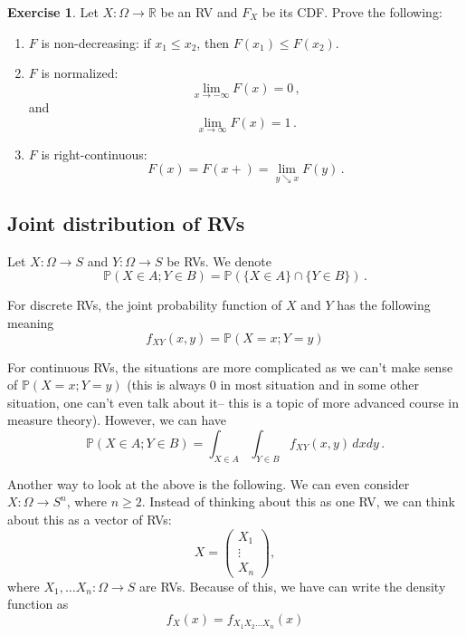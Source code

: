 \documentclass[
  openany]{book}
\theoremstyle{definition}
\theoremstyle{definition}
\theoremstyle{definition}
\newtheorem{exercise}{Exercise}[chapter]
\theoremstyle{definition}
\theoremstyle{remark}
\begin{document}
\begin{exercise}

Let \(X:\Omega \to \mathbb{R}\) be an RV and \(F_X\) be its CDF.
Prove the following:

\begin{enumerate}
\def\labelenumi{\arabic{enumi}.}
\item
  \(F\) is non-decreasing: if \(x_1 \leq x_2\), then \(F(x_1) \leq F(x_2)\).
\item
  \(F\) is normalized:
  \[ \lim_{x\to -\infty} F(x) = 0 \,,\]
  and
  \[ \lim_{x\to \infty} F(x) = 1 \,.\]
\item
  \(F\) is right-continuous:
  \[ F(x) = F(x+) = \lim_{y \searrow x} F(y) \,.\]
\end{enumerate}

\end{exercise}

\hypertarget{joint-distribution-of-rvs}{%
\subsection{Joint distribution of RVs}\label{joint-distribution-of-rvs}}

Let \(X:\Omega \to S\) and \(Y: \Omega \to S\) be RVs.
We denote
\[ \mathbb{P}(X \in A; Y \in B) = \mathbb{P}(\{X\in A\} \cap \{Y \in B \}) \,. \]

For discrete RVs, the joint probability function of \(X\) and \(Y\) has the following meaning
\[f_{XY}(x,y) = \mathbb{P}(X = x; Y = y)\]

For continuous RVs, the situations are more complicated as we can't make sense of \(\mathbb{P}(X = x; Y = y)\) (this is always 0 in most situation and in some other situation, one can't even talk about it-- this is a topic of more advanced course in measure theory).
However, we can have
\[\mathbb{P}(X \in A; Y \in B) = \int_{X \in A} \int_{Y \in B} f_{XY} (x,y) \, dx dy \,.\]

Another way to look at the above is the following.
We can even consider
\(X: \Omega \to S^n\),
where \(n\geq 2\).
Instead of thinking about this as one RV, we can think about this
as a vector of RVs:
\[ X = \begin{pmatrix} X_1 \\ \vdots \\ X_n \end{pmatrix},\]
where \(X_1, \dots X_n: \Omega \to S\) are RVs.
Because of this, we have can write the density function as
\[ f_X(x) = f_{X_1 X_2 \dots X_n}(x)\]
\end{document}
